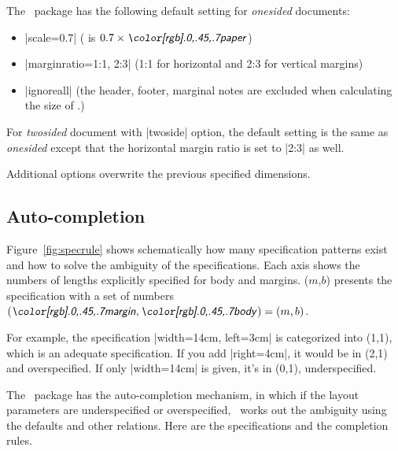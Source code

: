 The \Gm\ package has the following default setting for
 \textit{onesided} documents:
 \begin{itemize}\setlength{\itemsep}{-.5\parsep}
  \item |scale=0.7| ( is $0.7 \times \gpart{paper}$)
  \item |marginratio={1:1, 2:3}| (1:1 for horizontal and 2:3 for vertical margins)
  \item |ignoreall| (the header, footer, marginal notes are excluded
  when calculating the size of .)
\end{itemize}
 For \textit{twosided} document with |twoside| option, the default
 setting is the same as \textit{onesided} except that the horizontal
 margin ratio is set to |2:3| as well.

 Additional options overwrite the previous specified dimensions. 

 \subsection{Auto-completion} \label{sec:rules}

 Figure~\ref{fig:specrule} shows schematically how many specification
 patterns exist and how to solve the ambiguity of the
 specifications. Each axis shows the numbers of lengths
 explicitly specified for body and margins. \Ss($m$,$b$) presents the
 specification with a set of numbers $(\gpart{margin},\gpart{body})=(m,b)$.

 For example, the specification |width=14cm, left=3cm| is categorized
 into \Ss(1,1), which is an adequate specification. If you add
 |right=4cm|, it would be in \Ss(2,1) and overspecified. 
 If only |width=14cm| is given, it's in \Ss(0,1), underspecified. 

 The \Gm\ package has the auto-completion mechanism, in which
 if the layout parameters are underspecified or overspecified,
 \Gm\ works out the ambiguity using the defaults and other
 relations. Here are the specifications and the completion rules.

